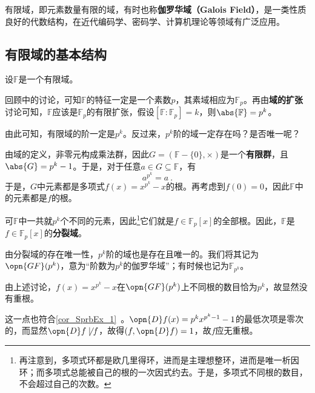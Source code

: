 


有限域，即元素数量有限的域，有时也称\textbf{伽罗华域（Galois Field）}，是一类性质良好的代数结构，在近代编码学、密码学、计算机理论等领域有广泛应用。

\subsection{有限域的基本结构}

设$\mathbb{F}$是一个有限域。

回顾中的讨论，可知$\mathbb{F}$的特征一定是一个素数$p$，其素域相应为$\mathbb{F}_p$。再由\textbf{域的扩张}讨论可知，$\mathbb{F}$应该是$\mathbb{F}_p$的有限扩张，假设$[\mathbb{F}:\mathbb{F}_p]=k$，则$\abs{\mathbb{F}}=p^k$。

由此可知，有限域的阶一定是$p^k$。反过来，$p^k$阶的域一定存在吗？是否唯一呢？

由域的定义，非零元构成乘法群，因此$G=(\mathbb{F}-\{0\}, \times)$是一个\textbf{有限群}，且$\abs{G}=p^k-1$。于是，对于任意$a\in G\subseteq\mathbb{F}$，有
\begin{equation}
a^{p^k}=a~.
\end{equation}
于是，$G$中元素都是多项式$f(x)=x^{p^k}-x$的根。再考虑到$f(0)=0$，因此$\mathbb{F}$中的元素都是$f$的根。

可$\mathbb{F}$中一共就$p^k$个不同的元素，因此\footnote{再注意到，多项式环都是欧几里得环，进而是主理想整环，进而是唯一析因环；而多项式总能被自己的根的一次因式约去。于是，多项式不同根的数目，不会超过自己的次数。}它们就是$f\in\mathbb{F}_p[x]$的全部根。因此，$\mathbb{F}$是$f\in\mathbb{F}_p[x]$的\textbf{分裂域}。

由分裂域的存在唯一性，$p^k$阶的域也是存在且唯一的。我们将其记为$\opn{GF}(p^k)$，意为“阶数为$p^k$的伽罗华域”；有时候也记为$\mathbb{F}_{p^k}$。

\begin{example}{}
由上述讨论，$f(x)=x^{p^k}-x$在$\opn{GF}(p^k)$上不同根的数目恰为$p^k$，故显然没有重根。

这一点也符合\autoref{cor_SprbEx_1}~。$\opn{D}f(x)=p^kx^{p^k-1}-1$的最低次项是零次的，而显然$\opn{D}f\not\mid f$，故得$(f, \opn{D}f)=1$，故$f$应无重根。
\end{example}


